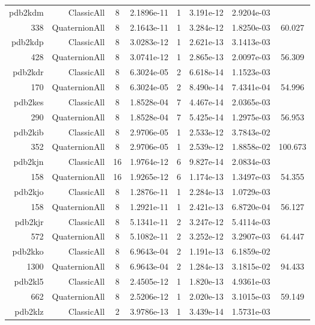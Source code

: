 \begin{xltabular}{\textwidth}{r|rcS[table-format=1.4e+2]cS[table-format=1.3e+2]S[table-format=1.4e+2]S[table-format=-1.3]}
pdb2kdm & ClassicAll & 8 & 2.1896e-11 & 1 & 3.191e-12 & 2.9204e-03 & \\
338 & QuaternionAll & 8 & 2.1643e-11 & 1 & 3.284e-12 & 1.8250e-03 & 60.027\\  \addlinespace
pdb2kdp & ClassicAll & 8 & 3.0283e-12 & 1 & 2.621e-13 & 3.1413e-03 & \\
428 & QuaternionAll & 8 & 3.0741e-12 & 1 & 2.865e-13 & 2.0097e-03 & 56.309\\  \addlinespace
pdb2kdr & ClassicAll & 8 & 6.3024e-05 & 2 & 6.618e-14 & 1.1523e-03 & \\
170 & QuaternionAll & 8 & 6.3024e-05 & 2 & 8.490e-14 & 7.4341e-04 & 54.996\\  \addlinespace
pdb2kes & ClassicAll & 8 & 1.8528e-04 & 7 & 4.467e-14 & 2.0365e-03 & \\
290 & QuaternionAll & 8 & 1.8528e-04 & 7 & 5.425e-14 & 1.2975e-03 & 56.953\\  \addlinespace
pdb2kib & ClassicAll & 8 & 2.9706e-05 & 1 & 2.533e-12 & 3.7843e-02 & \\
352 & QuaternionAll & 8 & 2.9706e-05 & 1 & 2.539e-12 & 1.8858e-02 & 100.673\\  \addlinespace
pdb2kjn & ClassicAll & 16 & 1.9764e-12 & 6 & 9.827e-14 & 2.0834e-03 & \\
158 & QuaternionAll & 16 & 1.9265e-12 & 6 & 1.174e-13 & 1.3497e-03 & 54.355\\  \addlinespace
pdb2kjo & ClassicAll & 8 & 1.2876e-11 & 1 & 2.284e-13 & 1.0729e-03 & \\
158 & QuaternionAll & 8 & 1.2921e-11 & 1 & 2.421e-13 & 6.8720e-04 & 56.127\\  \addlinespace
pdb2kjr & ClassicAll & 8 & 5.1341e-11 & 2 & 3.247e-12 & 5.4114e-03 & \\
572 & QuaternionAll & 8 & 5.1082e-11 & 2 & 3.252e-12 & 3.2907e-03 & 64.447\\  \addlinespace
pdb2kko & ClassicAll & 8 & 6.9643e-04 & 2 & 1.191e-13 & 6.1859e-02 & \\
1300 & QuaternionAll & 8 & 6.9643e-04 & 2 & 1.284e-13 & 3.1815e-02 & 94.433\\  \addlinespace
pdb2kl5 & ClassicAll & 8 & 2.4505e-12 & 1 & 1.820e-13 & 4.9361e-03 & \\
662 & QuaternionAll & 8 & 2.5206e-12 & 1 & 2.020e-13 & 3.1015e-03 & 59.149\\  \addlinespace
pdb2klz & ClassicAll & 2 & 3.9786e-13 & 1 & 3.439e-14 & 1.5731e-03 & \\

\end{xltabular}
